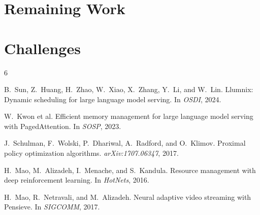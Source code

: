\documentclass{article}
\begin{document}

\section{Remaining Work}


\section{Challenges}


\begin{thebibliography}{6}
\small

B.~Sun, Z.~Huang, H.~Zhao, W.~Xiao, X.~Zhang, Y.~Li, and W.~Lin.
Llumnix: Dynamic scheduling for large language model serving.
In \emph{OSDI}, 2024.

W.~Kwon et al.
Efficient memory management for large language model serving with {PagedAttention}.
In \emph{SOSP}, 2023.

J.~Schulman, F.~Wolski, P.~Dhariwal, A.~Radford, and O.~Klimov.
Proximal policy optimization algorithms.
\emph{arXiv:1707.06347}, 2017.

H.~Mao, M.~Alizadeh, I.~Menache, and S.~Kandula.
Resource management with deep reinforcement learning.
In \emph{HotNets}, 2016.

H.~Mao, R.~Netravali, and M.~Alizadeh.
Neural adaptive video streaming with {Pensieve}.
In \emph{SIGCOMM}, 2017.

\end{thebibliography}
\end{document}
